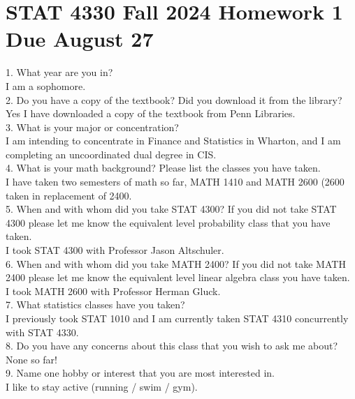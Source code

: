 \documentclass[a4paper, 10pt]{article}
\begin{document}
\pagestyle{fancy}

\section{STAT 4330 Fall 2024 Homework 1 Due August 27}

1. What year are you in?  \\

I am a sophomore.   \\

2. Do you have a copy of the textbook? Did you download it from the library?  \\

Yes I have downloaded a copy of the textbook from Penn Libraries.  \\

3. What is your major or concentration?  \\
 
I am intending to concentrate in Finance and Statistics in Wharton, and I am completing an uncoordinated dual degree in CIS.   \\

4. What is your math background? Please list the classes you have taken.  \\

I have taken two semesters of math so far, MATH 1410 and MATH 2600 (2600 taken in replacement of 2400.\\

5. When and with whom did you take STAT 4300? If you did not take STAT 4300 please let me know the equivalent level probability class that you have taken.\\

I took STAT 4300 with Professor Jason Altschuler. \\

6. When and with whom did you take MATH 2400? If you did not take MATH 2400 please let me know the equivalent level linear algebra class you have taken.\\

I took MATH 2600 with Professor Herman Gluck.  \\

7. What statistics classes have you taken? \\

I previously took STAT 1010 and I am currently taken STAT 4310 concurrently with STAT 4330.  \\

8. Do you have any concerns about this class that you wish to ask me about?  \\

None so far!  \\

9. Name one hobby or interest that you are most interested in. \\

I like to stay active (running / swim / gym). 
\end{document}
